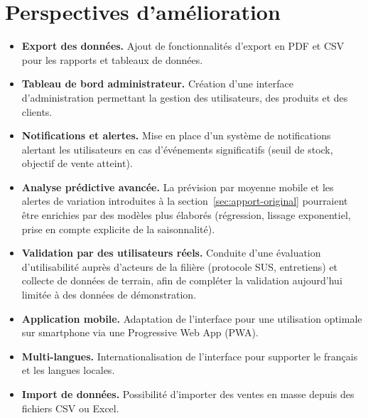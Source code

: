 \documentclass[11pt,a4paper]{report}
\begin{document}
\section{Perspectives d'amélioration}
\begin{itemize}
  \item \textbf{Export des données.} Ajout de fonctionnalités d'export en PDF et
        CSV pour les rapports et tableaux de données.
  \item \textbf{Tableau de bord administrateur.} Création d'une interface
        d'administration permettant la gestion des utilisateurs, des produits et
        des clients.
  \item \textbf{Notifications et alertes.} Mise en place d'un système de
        notifications alertant les utilisateurs en cas d'événements significatifs
        (seuil de stock, objectif de vente atteint).
  \item \textbf{Analyse prédictive avancée.} La prévision par moyenne mobile et
        les alertes de variation introduites à la section~\ref{sec:apport-original}
        pourraient être enrichies par des modèles plus élaborés (régression,
        lissage exponentiel, prise en compte explicite de la saisonnalité).
  \item \textbf{Validation par des utilisateurs réels.} Conduite d'une
        évaluation d'utilisabilité auprès d'acteurs de la filière (protocole SUS,
        entretiens) et collecte de données de terrain, afin de compléter la
        validation aujourd'hui limitée à des données de démonstration.
  \item \textbf{Application mobile.} Adaptation de l'interface pour une
        utilisation optimale sur smartphone via une Progressive Web App (PWA).
  \item \textbf{Multi-langues.} Internationalisation de l'interface pour
        supporter le français et les langues locales.
  \item \textbf{Import de données.} Possibilité d'importer des ventes en masse
        depuis des fichiers CSV ou Excel.
\end{itemize}
\end{document}
